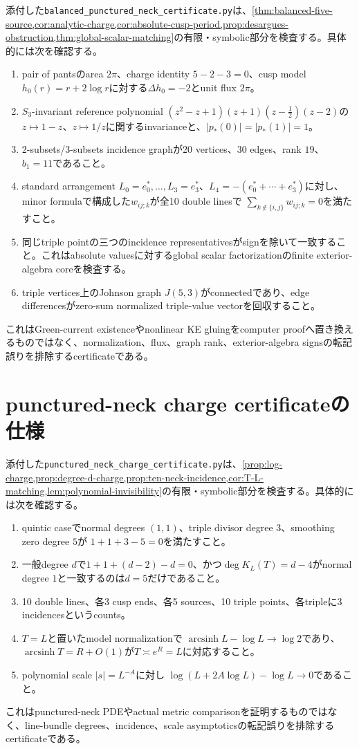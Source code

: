 \documentclass[11pt,a4paper]{ltjsarticle}
\theoremstyle{definition}
\theoremstyle{remark}
\begin{document}
添付した\texttt{balanced\_punctured\_neck\_certificate.py}は、\cref{thm:balanced-five-source,cor:analytic-charge,cor:absolute-cusp-period,prop:desargues-obstruction,thm:global-scalar-matching}の有限・symbolic部分を検査する。具体的には次を確認する。
\begin{enumerate}[leftmargin=2.5em]
\item pair of pantsのarea $2\pi$、charge identity $5-2-3=0$、cusp model $h_0(r)=r+2\log r$に対する$\Delta h_0=-2$とunit flux $2\pi$。
\item $S_3$-invariant reference polynomial
$(z^2-z+1)(z+1)(z-\tfrac12)(z-2)$の$z\mapsto1-z$、$z\mapsto1/z$に関するinvarianceと、$|p_*(0)|=|p_*(1)|=1$。
\item 2-subsets/3-subsets incidence graphが20 vertices、30 edges、rank $19$、$b_1=11$であること。
\item standard arrangement
$L_0=e_0^*,\ldots,L_3=e_3^*$、$L_4=-(e_0^*+\cdots+e_3^*)$に対し、minor formulaで構成した$w_{ij;k}$が全10 double linesで
$\sum_{k\notin\{i,j\}}w_{ij;k}=0$を満たすこと。
\item 同じtriple pointの三つのincidence representativesがsignを除いて一致すること。これはabsolute valuesに対するglobal scalar factorizationのfinite exterior-algebra coreを検査する。
\item triple vertices上のJohnson graph $J(5,3)$がconnectedであり、edge differencesがzero-sum normalized triple-value vectorを回収すること。
\end{enumerate}
これはGreen-current existenceやnonlinear KE gluingをcomputer proofへ置き換えるものではなく、normalization、flux、graph rank、exterior-algebra signsの転記誤りを排除するcertificateである。

\section{punctured-neck charge certificateの仕様}

添付した\texttt{punctured\_neck\_charge\_certificate.py}は、\cref{prop:log-charge,prop:degree-d-charge,prop:ten-neck-incidence,cor:T-L-matching,lem:polynomial-invisibility}の有限・symbolic部分を検査する。具体的には次を確認する。
\begin{enumerate}[leftmargin=2.5em]
\item quintic caseでnormal degrees $(1,1)$、triple divisor degree $3$、smoothing zero degree $5$が
$1+1+3-5=0$を満たすこと。
\item 一般degree $d$で$1+1+(d-2)-d=0$、かつ$\deg K_L(T)=d-4$がnormal degree $1$と一致するのは$d=5$だけであること。
\item 10 double lines、各3 cusp ends、各5 sources、10 triple points、各tripleに3 incidencesというcounts。
\item $T=L$と置いたmodel normalizationで
$\operatorname{arcsinh}L-\log L\to\log2$であり、$\operatorname{arcsinh}T=R+O(1)$が$T\asymp e^R=L$に対応すること。
\item polynomial scale $|s|=L^{-A}$に対し
$\log(L+2A\log L)-\log L\to0$であること。
\end{enumerate}
これはpunctured-neck PDEやactual metric comparisonを証明するものではなく、line-bundle degrees、incidence、scale asymptoticsの転記誤りを排除するcertificateである。
\end{document}
